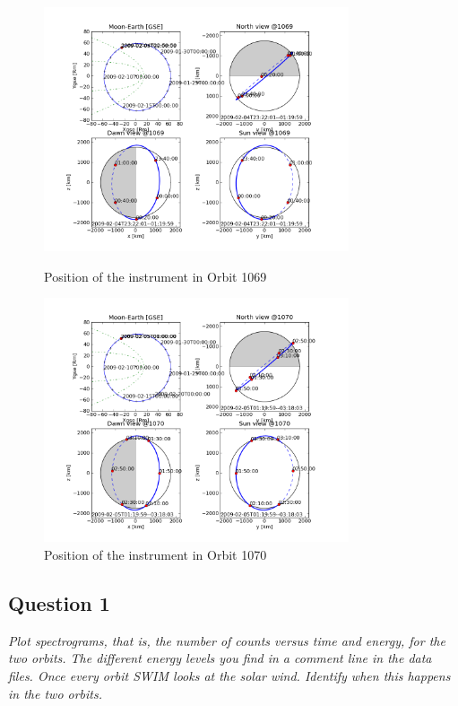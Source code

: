 \documentclass{article}
\begin{document}
\begin{figure}[ht]
\begin{minipage}[c]{0.5\linewidth}
\centering
\includegraphics[width=9cm]{Figures/orbit_1069.png}
\caption{Position of the instrument in Orbit 1069}
\label{fig:orbit_1069}
\end{minipage}
\hspace{0.2cm}
\begin{minipage}[c]{0.5\linewidth}
\centering
\includegraphics[width=9cm]{Figures/orbit_1070.png}
\caption{Position of the instrument in Orbit 1070}
\label{fig:orbit_1070}
\end{minipage}
\end{figure}


\subsection{Question 1}
\textit{Plot spectrograms, that is, the number of counts versus time and energy, for the
two orbits. The different energy levels you find in a comment line in the data files.
Once every orbit SWIM looks at the solar wind. Identify when this happens in the two
orbits.}
\end{document}
